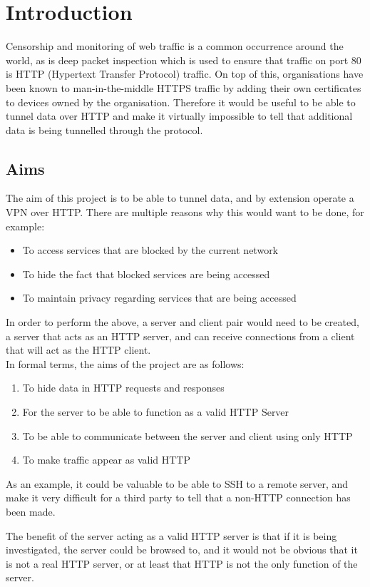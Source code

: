 \section{Introduction}
Censorship and monitoring of web traffic is a common occurrence around the world, as is deep packet inspection which is used to ensure that traffic on port 80 is HTTP (Hypertext Transfer Protocol) traffic.
On top of this, organisations have been known to man-in-the-middle HTTPS traffic by adding their own certificates to devices owned by the organisation.
Therefore it would be useful to be able to tunnel data over HTTP and make it virtually impossible to tell that additional data is being tunnelled through the protocol.

\subsection{Aims}
The aim of this project is to be able to tunnel data, and by extension operate a VPN over HTTP\@. There are multiple reasons why this would want to be done, for example:
\begin{itemize}
    \item To access services that are blocked by the current network
    \item To hide the fact that blocked services are being accessed
    \item To maintain privacy regarding services that are being accessed
\end{itemize}
In order to perform the above, a server and client pair would need to be created, a server that acts as an HTTP server, and can receive connections from a client that will act as the HTTP client.\\
In formal terms, the aims of the project are as follows:
\begin{enumerate}
    \item To hide data in HTTP requests and responses
    \item For the server to be able to function as a valid HTTP Server
    \item To be able to communicate between the server and client using only HTTP
    \item To make traffic appear as valid HTTP
\end{enumerate}
As an example, it could be valuable to be able to SSH to a remote server, and make it very difficult for a third party to tell that a non-HTTP connection has been made.\par
The benefit of the server acting as a valid HTTP server is that if it is being investigated, the server could be browsed to, and it would not be obvious that it is not a real HTTP server, or at least that HTTP is not the only function of the server.

